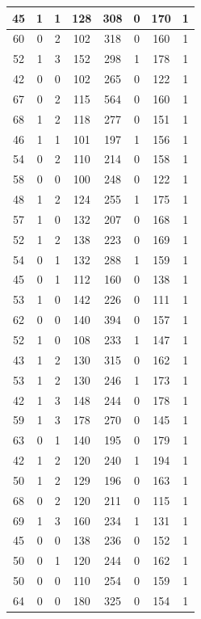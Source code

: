 \documentclass{article}
\begin{document}
\begin{longtable}{|c|c|c|c|c|c|c|c|}
\hline
45 & 1 & 1 & 128 & 308 & 0 & 170 & 1 \\
\hline
60 & 0 & 2 & 102 & 318 & 0 & 160 & 1 \\
\hline
52 & 1 & 3 & 152 & 298 & 1 & 178 & 1 \\
\hline
42 & 0 & 0 & 102 & 265 & 0 & 122 & 1 \\
\hline
67 & 0 & 2 & 115 & 564 & 0 & 160 & 1 \\
\hline
68 & 1 & 2 & 118 & 277 & 0 & 151 & 1 \\
\hline
46 & 1 & 1 & 101 & 197 & 1 & 156 & 1 \\
\hline
54 & 0 & 2 & 110 & 214 & 0 & 158 & 1 \\
\hline
58 & 0 & 0 & 100 & 248 & 0 & 122 & 1 \\
\hline
48 & 1 & 2 & 124 & 255 & 1 & 175 & 1 \\
\hline
57 & 1 & 0 & 132 & 207 & 0 & 168 & 1 \\
\hline
52 & 1 & 2 & 138 & 223 & 0 & 169 & 1 \\
\hline
54 & 0 & 1 & 132 & 288 & 1 & 159 & 1 \\
\hline
45 & 0 & 1 & 112 & 160 & 0 & 138 & 1 \\
\hline
53 & 1 & 0 & 142 & 226 & 0 & 111 & 1 \\
\hline
62 & 0 & 0 & 140 & 394 & 0 & 157 & 1 \\
\hline
52 & 1 & 0 & 108 & 233 & 1 & 147 & 1 \\
\hline
43 & 1 & 2 & 130 & 315 & 0 & 162 & 1 \\
\hline
53 & 1 & 2 & 130 & 246 & 1 & 173 & 1 \\
\hline
42 & 1 & 3 & 148 & 244 & 0 & 178 & 1 \\
\hline
59 & 1 & 3 & 178 & 270 & 0 & 145 & 1 \\
\hline
63 & 0 & 1 & 140 & 195 & 0 & 179 & 1 \\
\hline
42 & 1 & 2 & 120 & 240 & 1 & 194 & 1 \\
\hline
50 & 1 & 2 & 129 & 196 & 0 & 163 & 1 \\
\hline
68 & 0 & 2 & 120 & 211 & 0 & 115 & 1 \\
\hline
69 & 1 & 3 & 160 & 234 & 1 & 131 & 1 \\
\hline
45 & 0 & 0 & 138 & 236 & 0 & 152 & 1 \\
\hline
50 & 0 & 1 & 120 & 244 & 0 & 162 & 1 \\
\hline
50 & 0 & 0 & 110 & 254 & 0 & 159 & 1 \\
\hline
64 & 0 & 0 & 180 & 325 & 0 & 154 & 1 \\

\end{longtable}
\end{document}
